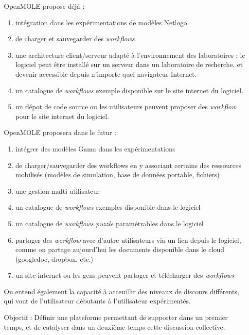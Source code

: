 OpenMOLE propose déjà : 
\begin{enumerate}
\item intégration dans les expérimentations de modèles Netlogo
\item de charger et sauvegarder des \textit{workflows} 
\item une architecture client/serveur adapté à l'environnement des laboratoires : le logiciel peut être installé sur un serveur dans un laboratoire de recherche, et devenir accessible depuis n'importe quel navigateur Internet.   
\item un catalogue de \textit{workflows} exemple disponible sur le site internet du logiciel.
\item un dépot de code source ou les utilisateurs peuvent proposer des \textit{workflow} pour le site internet du logiciel.
\end{enumerate}

OpenMOLE proposera dans le futur : 
\begin{enumerate}
\item intégrer des modèles Gama dans les expérimentations
\item de charger/sauvegarder des workflows en y associant certains des ressources mobilisés (modèles de simulation, base de données portable, fichiers)
\item une gestion multi-utilisateur
\item un catalogue de \textit{workflows} exemples disponible dans le logiciel
\item un catalogue de \textit{workflows puzzle} paramétrables dans le logiciel
\item partager des \textit{workflow} avec d'autre utilisateurs via un lien depuis le logiciel, comme on partage aujourd'hui les documents disponible dans le cloud (googledoc, dropbox, etc.)
\item un site internet ou les gens peuvent partager et télécharger des \textit{workflows}
\end{enumerate}




On entend également la capacité à acceuillir des niveaux de discours différents, qui vont de l'utilisateur débutants à l'utilisateur expérimentés.

Objectif : Définir une plateforme permettant de supporter dans un premier temps, et de catalyser dans un deuxième temps cette discussion collective.

